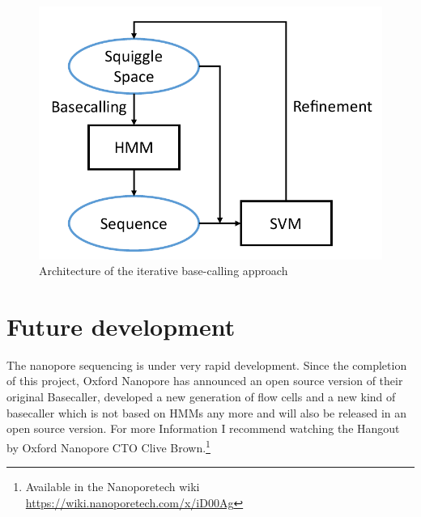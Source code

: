 \documentclass[]{scrartcl}
\begin{document}
\begin{figure}[htbp]
\centering
\includegraphics[width=.5\textwidth]{figures/iterative-basecalling.pdf}
\caption{Architecture of the iterative base-calling approach}
\label{fig:iterative}
\end{figure}

\section{Future development}
\label{sec:future}
The nanopore sequencing is under very rapid development. Since the completion of this project, Oxford Nanopore has announced an open source version of their original Basecaller, developed a new generation of flow cells and a new kind of basecaller which is not based on HMMs any more and will also be released in an open source version. 
For more Information I recommend watching the Hangout by Oxford Nanopore CTO Clive Brown.\footnote{Available in the Nanoporetech wiki \url{https://wiki.nanoporetech.com/x/iD00Ag}}

\printbibliography
\end{document}
